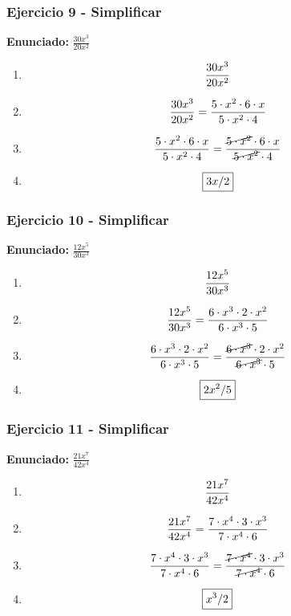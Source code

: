 \documentclass[11pt,a4paper]{article}
\newcommand{\fitmath}[1]{%
\[
\setbox0=\hbox{$\displaystyle #1$}%
\ifdim\wd0>\linewidth
\resizebox{\linewidth}{!}{$\displaystyle #1$}%
\else
#1%
\fi
\]
}
\begin{document}
\vspace{0.12cm}
\subsubsection*{Ejercicio 9 - Simplificar}
\textbf{Enunciado:} $ \frac{30 x^{3}}{20 x^{2}} $\par
\begin{enumerate}[leftmargin=2em]
\item \fitmath{\frac{30 x^{3}}{20 x^{2}}}
\item \fitmath{\frac{30 x^{3}}{20 x^{2}}=\frac{5\cdot x^{2}\cdot 6\cdot x}{5\cdot x^{2}\cdot 4}}
\item \fitmath{\frac{5\cdot x^{2}\cdot 6\cdot x}{5\cdot x^{2}\cdot 4}=\frac{\cancel{5\cdot x^{2}}\cdot 6\cdot x}{\cancel{5\cdot x^{2}}\cdot 4}}
\item \fitmath{\boxed{3 x / 2}}
\end{enumerate}

\vspace{0.12cm}
\subsubsection*{Ejercicio 10 - Simplificar}
\textbf{Enunciado:} $ \frac{12 x^{5}}{30 x^{3}} $\par
\begin{enumerate}[leftmargin=2em]
\item \fitmath{\frac{12 x^{5}}{30 x^{3}}}
\item \fitmath{\frac{12 x^{5}}{30 x^{3}}=\frac{6\cdot x^{3}\cdot 2\cdot x^{2}}{6\cdot x^{3}\cdot 5}}
\item \fitmath{\frac{6\cdot x^{3}\cdot 2\cdot x^{2}}{6\cdot x^{3}\cdot 5}=\frac{\cancel{6\cdot x^{3}}\cdot 2\cdot x^{2}}{\cancel{6\cdot x^{3}}\cdot 5}}
\item \fitmath{\boxed{2 x^{2} / 5}}
\end{enumerate}

\vspace{0.12cm}
\subsubsection*{Ejercicio 11 - Simplificar}
\textbf{Enunciado:} $ \frac{21 x^{7}}{42 x^{4}} $\par
\begin{enumerate}[leftmargin=2em]
\item \fitmath{\frac{21 x^{7}}{42 x^{4}}}
\item \fitmath{\frac{21 x^{7}}{42 x^{4}}=\frac{7\cdot x^{4}\cdot 3\cdot x^{3}}{7\cdot x^{4}\cdot 6}}
\item \fitmath{\frac{7\cdot x^{4}\cdot 3\cdot x^{3}}{7\cdot x^{4}\cdot 6}=\frac{\cancel{7\cdot x^{4}}\cdot 3\cdot x^{3}}{\cancel{7\cdot x^{4}}\cdot 6}}
\item \fitmath{\boxed{x^{3} / 2}}
\end{enumerate}
\end{document}
